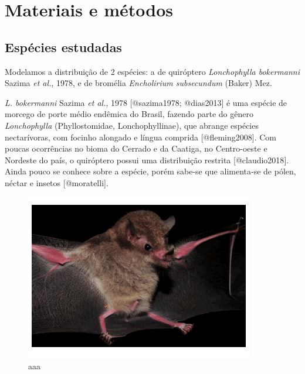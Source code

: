 \documentclass[
  11pt,
]{article}
\author{}
\date{\vspace{-2.5em}}
\begin{document}
\clearpage

\hypertarget{materiais-e-muxe9todos}{%
\section{Materiais e métodos}\label{materiais-e-muxe9todos}}

\hypertarget{espuxe9cies-estudadas}{%
\subsection{Espécies estudadas}\label{espuxe9cies-estudadas}}

Modelamos a distribuição de 2 espécies: a de quiróptero
\emph{Lonchophylla bokermanni} Sazima \emph{et al.}, 1978, e de bromélia
\emph{Encholirium subsecundum} (Baker) Mez.

\emph{L. bokermanni} Sazima \emph{et al.}, 1978 {[}@sazima1978;
@dias2013{]} é uma espécie de morcego de porte médio endêmica do Brasil,
fazendo parte do gênero \emph{Lonchophylla} (Phyllostomidae,
Lonchophyllinae), que abrange espécies nectarívoras, com focinho
alongado e língua comprida {[}@fleming2008{]}. Com poucas ocorrências no
bioma do Cerrado e da Caatiga, no Centro-oeste e Nordeste do país, o
quiróptero possui uma distribuição restrita {[}@claudio2018{]}. Ainda
pouco se conhece sobre a espécie, porém sabe-se que alimenta-se de
pólen, néctar e insetos {[}@moratelli{]}.

\begin{figure}
\centering
\includegraphics{../RMarkdown/bokermanni.png}
\caption{aaa}
\end{figure}
\end{document}

